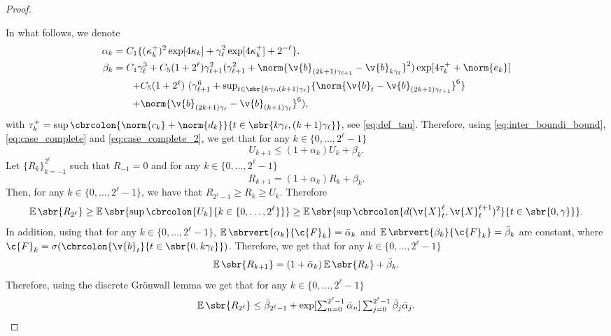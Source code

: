 \begin{proof}{}{}
\begin{enumerate}[wide, labelindent=0pt, label=(\alph*)]
	\end{enumerate}
	In what follows, we denote \begin{align} \alpha_k & = C_1\{ (\kappa_k^+)^2 \exp[4 \kappa_k] + \gamma_\ell^2 \exp[4\kappa_k^+] + 2^{-\ell} \} .
              \\
              \beta_k  & =  C_1  \gamma_\ell^3 + C_5 (1 + 2^\ell) \gamma_{\ell+1}^2  (\gamma_{\ell+1}^2 + \norm{\v{b}_{(2k+1)\gamma_{\ell+1}} - \v{b}_{k\gamma_{\ell}}}^2)\exp[4 \tau_k^+ + \norm{e_k}] \\
                       & \qquad \textstyle{ +  C_5 (1 + 2^\ell) \ (\gamma_{\ell+1}^6 + \sup_{t \in \sbr{k\gamma_\ell, (k+1) \gamma_\ell}} \{\norm{\v{b}_{t} - \v{b}_{(2k+1) \gamma_{\ell+1}}}^6\}}      \\ & \qquad \textstyle{ + \norm{\v{b}_{(2k+1) \gamma_{\ell}} - \v{b}_{(k+1) \gamma_{\ell}}}^6)  , }
	\end{align}
	with
	$\tau_k^+ = \sup \cbrcolon{\norm{c_k} + \norm{d_k}}{t \in
			\sbr{k \gamma_\ell, (k+1) \gamma_\ell}}$, see \eqref{eq:def_tau}.
	Therefore, using \eqref{eq:inter_boundi_bound}, \eqref{eq:case_complete} and \eqref{eq:case_complete_2}, we get that for any $k \in \{0, \dots, 2^\ell -1\}$ \begin{equation} U_{k+1} \leq (1 + \alpha_k) U_k + \beta_k .
	\end{equation}
	Let $\{R_k\}_{k=-1}^{2^\ell}$ such that $R_{-1}=0$ and for any $k \in \{0, \dots, 2^{\ell}-1\}$ \begin{equation} R_{k+1} = (1 + \alpha_k) R_k + \beta_k .
	\end{equation}
	Then, for any $k \in \{0, \dots, 2^{\ell}-1\}$, we have that $R_{2^\ell -1} \geq R_k \ge U_k$.
	Therefore \begin{equation} \label{eq:bound_sup} \E\sbr{R_{2^\ell}} \geq \E\sbr{\sup \cbrcolon{U_k}{k \in \{0, \dots, 2^\ell\}}} \geq \E\sbr{\sup \cbrcolon{d(\v{X}_t^\ell, \v{X}_t^{\ell+1})^2}{t \in \sbr{0,\gamma}}} .
	\end{equation}
	In addition, using that for any $k \in \{0, \dots, 2^\ell - 1\}$, $\E\sbrvert{\alpha_k}{\c{F}_k} = \bar{\alpha}_k$ and $\E\sbrvert{\beta_k}{\c{F}_k} = \bar{\beta}_k$ are constant, where $\c{F}_k = \sigma(\cbrcolon{\v{b}_t}{t \in \sbr{0, k \gamma_\ell}})$.
	Therefore, we get that for any $k \in \{0, \dots, 2^\ell - 1\}$ \begin{equation} \E\sbr{R_{k+1}} = (1 + \bar{\alpha}_k) \E\sbr{R_k} + \bar{\beta}_k .
	\end{equation}
	Therefore, using the discrete Gr\"onwall lemma we get that for any $k \in \{0, \dots, 2^{\ell}-1\}$ \begin{equation} \textstyle{ \E\sbr{R_{2^\ell}} \leq \bar{\beta}_{2^{\ell}-1} + \exp[\sum_{n=0}^{2^\ell - 1} \bar{\alpha}_n] \sum_{j=0}^{2^\ell - 1} \bar{\beta}_j \bar{\alpha}_j .
}
\end{equation}
\end{proof}
